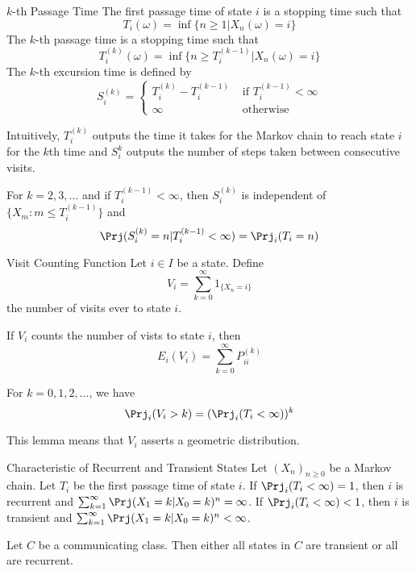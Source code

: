 \documentclass[a4paper]{article}
\begin{document}
\begin{defn}{$k$-th Passage Time}{} The first passage time of state $i$ is a stopping time such that $$T_i(\omega)=\inf\{n\geq 1|X_n(\omega)=i\}$$ The $k$-th passage time is a stopping time such that $$T_i^{(k)}(\omega)=\inf\{n\geq T_i^{(k-1)}|X_n(\omega)=i\}$$ The $k$-th excursion time is defined by $$S_i^{(k)}=\begin{cases}
T_i^{(k)}-T_i^{(k-1)} & \text{ if }T_i^{(k-1)}<\infty\\
\infty & \text{ otherwise }
\end{cases}$$
\end{defn}

Intuitively, $T_i^{(k)}$ outputs the time it takes for the Markov chain to reach state $i$ for the $k$th time and $S_i^k$ outputs the number of steps taken between consecutive visits. 

\begin{lmm}{}{} For $k=2,3,\dots$ and if $T_i^{(k-1)}<\infty$, then $S_i^{(k)}$ is independent of $\{X_m:m\leq T_i^{(k-1)}\}$ and $$\Prj(S_i^{(k)}=n|T_i^{(k-1)}<\infty)=\Prj_i(T_i=n)$$
\end{lmm}

\begin{defn}{Visit Counting Function}{} Let $i\in I$ be a state. Define $$V_i=\sum_{k=0}^\infty1_{\{X_n=i\}}$$ the number of visits ever to state $i$. 
\end{defn}

\begin{lmm}{}{} If $V_i$ counts the number of vists to state $i$, then $$E_i(V_i)=\sum_{k=0}^\infty P_{ii}^{(k)}$$
\end{lmm}

\begin{lmm}{}{} For $k=0,1,2,\dots$, we have $$\Prj_i(V_i>k)=(\Prj_i(T_i<\infty))^k$$
\end{lmm}

This lemma means that $V_i$ asserts a geometric distribution. 

\begin{thm}{Characteristic of Recurrent and Transient States}{} Let $(X_n)_{n\geq 0}$ be a Markov chain. Let $T_i$ be the first passage time of state $i$. If $\Prj_i(T_i<\infty)=1$, then $i$ is recurrent and $\sum_{k=1}^\infty\Prj(X_1=k|X_0=k)^n=\infty$. If $\Prj_i(T_i<\infty)<1$, then $i$ is transient and $\sum_{k=1}^\infty\Prj(X_1=k|X_0=k)^n<\infty$. 
\end{thm} 

\begin{thm}{}{} Let $C$ be a communicating class. Then either all states in $C$ are transient or all are recurrent. 
\end{thm}
\end{document}
